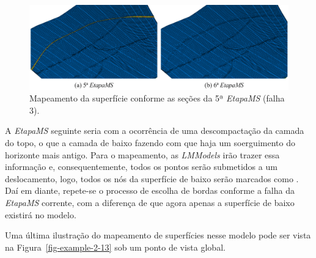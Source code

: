 \begin{figure} [H]
  \begin{center}
    \includegraphics[width=\textwidth]{images/fig-example-2-12}
    \caption{Mapeamento da superfície conforme as seções da 5ª \textit{EtapaMS} (falha 3).}\label{fig-example-2-12}
  \end{center}
\end{figure}

A \textit{EtapaMS} seguinte seria com a ocorrência de uma descompactação da camada do topo, o que  a camada de baixo fazendo com que haja um soerguimento do horizonte mais antigo. Para o mapeamento, as \textit{LMModels} irão trazer essa informação e, consequentemente, todos os pontos serão submetidos a um deslocamento, logo, todos os nós da superfície de baixo serão marcados como . Daí em diante, repete-se o processo de escolha de bordas conforme a falha da \textit{EtapaMS} corrente, com a diferença de que agora apenas a superfície de baixo existirá no modelo.

Uma última ilustração do mapeamento de superfícies nesse modelo pode ser vista na Figura~\ref{fig-example-2-13} sob um ponto de vista global.


